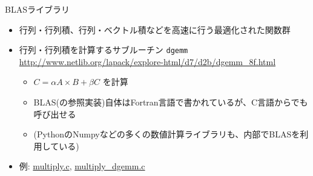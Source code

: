 \begin{frame}[t,fragile]{BLASライブラリ}
  \begin{itemize}
  \item 行列・行列積、行列・ベクトル積などを高速に行う最適化された関数群
  \item 行列・行列積を計算するサブルーチン {\tt dgemm} \\
    \url{http://www.netlib.org/lapack/explore-html/d7/d2b/dgemm_8f.html}
    \begin{itemize}
    \item $C = \alpha A \times B + \beta C$ を計算
    \item BLAS(の参照実装)自体はFortran言語で書かれているが、C言語からでも呼び出せる
    \item (PythonのNumpyなどの多くの数値計算ライブラリも、内部でBLASを利用している)
    \end{itemize}
  \item 例: \href{https://github.com/todo-group/computer-experiments/blob/master/exercise/matrix/multiply.c}{multiply.c}, \href{https://github.com/todo-group/computer-experiments/blob/master/exercise/matrix/multiply_dgemm.c}{multiply\_dgemm.c}
  \end{itemize}
\end{frame}
